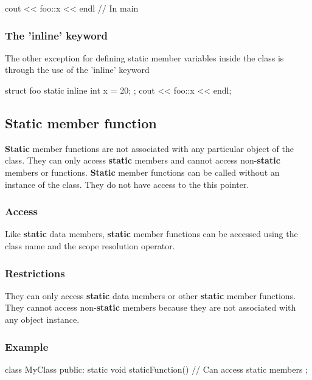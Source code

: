 \documentclass{report}
\begin{document}
\begin{concept}
\begin{cppcode}
    cout << foo::x << endl // In main
    \end{cppcode}

    \bigbreak \noindent 
    \subsubsection{The 'inline' keyword}
    \bigbreak \noindent 
    The other exception for defining static member variables inside the class is through the use of the 'inline' keyword
    \bigbreak \noindent 
    \begin{cppcode}
        struct foo {
            static inline int x = 20;
        };
        cout << foo::x << endl;
    \end{cppcode}
    \bigbreak \noindent 

    \bigbreak \noindent 
    \subsection{Static member function}
    \bigbreak \noindent 
    \textbf{Static} member functions are not associated with any particular object of the class. They can only access \textbf{static} members and cannot access non-\textbf{static} members or functions.
    \bigbreak \noindent 
    \textbf{Static} member functions can be called without an instance of the class. They do not have access to the this pointer.
    \bigbreak \noindent 
    \subsubsection{Access}
    \bigbreak \noindent 
    Like \textbf{static} data members, \textbf{static} member functions can be accessed using the class name and the scope resolution operator.
    \bigbreak \noindent 
    \subsubsection{Restrictions}
    \bigbreak \noindent 
    They can only access \textbf{static} data members or other \textbf{static} member functions. They cannot access non-\textbf{static} members because they are not associated with any object instance.
    \bigbreak \noindent 
    \subsubsection{Example}
    \bigbreak \noindent 
    \begin{cppcode}
        class MyClass {
            public:
            static void staticFunction() {
                // Can access static members
            }
        };
    \end{cppcode}


\end{concept}
\end{document}
